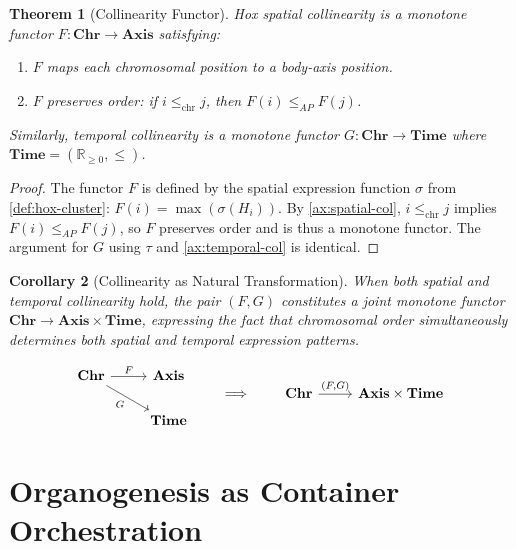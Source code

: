 \documentclass[12pt,a4paper]{article}
\newtheorem{theorem}{Theorem}[section]
\newtheorem{corollary}[theorem]{Corollary}
\begin{document}
\begin{theorem}[Collinearity Functor]\label{thm:collinearity-functor}
Hox spatial collinearity is a \emph{monotone functor}
$F : \mathbf{Chr} \to \mathbf{Axis}$ satisfying:
\begin{enumerate}
  \item $F$ maps each chromosomal position to a body-axis position.
  \item $F$ preserves order: if $i \leq_{\text{chr}} j$, then
    $F(i) \leq_{AP} F(j)$.
\end{enumerate}
Similarly, temporal collinearity is a monotone functor
$G : \mathbf{Chr} \to \mathbf{Time}$ where $\mathbf{Time} =
(\mathbb{R}_{\geq 0}, \leq)$.
\end{theorem}

\begin{proof}
The functor $F$ is defined by the spatial expression function
$\sigma$ from \cref{def:hox-cluster}: $F(i) = \max(\sigma(H_i))$.
By \cref{ax:spatial-col}, $i \leq_{\text{chr}} j$ implies
$F(i) \leq_{AP} F(j)$, so $F$ preserves order and is thus a
monotone functor.  The argument for $G$ using $\tau$ and
\cref{ax:temporal-col} is identical.
\end{proof}

\begin{corollary}[Collinearity as Natural Transformation]
When both spatial and temporal collinearity hold, the pair
$(F, G)$ constitutes a \emph{joint monotone functor}
$\mathbf{Chr} \to \mathbf{Axis} \times \mathbf{Time}$,
expressing the fact that chromosomal order simultaneously
determines both spatial and temporal expression patterns.
\end{corollary}

\[
\begin{tikzcd}
  \mathbf{Chr} \arrow[r, "F"] \arrow[dr, "G"'] &
    \mathbf{Axis} \\
  & \mathbf{Time}
\end{tikzcd}
\qquad\Longrightarrow\qquad
\begin{tikzcd}
  \mathbf{Chr} \arrow[r, "{(F,G)}"] & \mathbf{Axis} \times \mathbf{Time}
\end{tikzcd}
\]


\section{Organogenesis as Container Orchestration}\label{sec:organogenesis}
\end{document}
